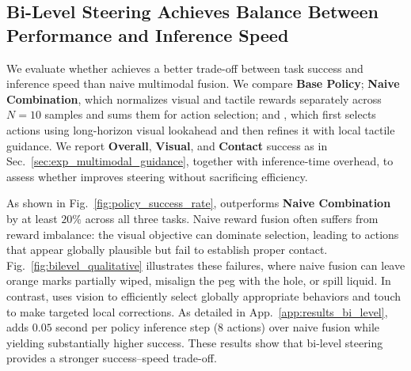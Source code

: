 \subsection{Bi-Level Steering Achieves Balance Between Performance and Inference Speed}
\label{sec:experiment_bilevel}

We evaluate whether \ours achieves a better trade-off between task success and inference speed than naive multimodal fusion. We compare \textbf{Base Policy}; \textbf{Naive Combination}, which normalizes visual and tactile rewards separately across $N=10$ samples and sums them for action selection; and \ours, which first selects actions using long-horizon visual lookahead and then refines it with local tactile guidance. We report \textbf{Overall}, \textbf{Visual}, and \textbf{Contact} success as in Sec.~\ref{sec:exp_multimodal_guidance}, together with inference-time overhead, to assess whether \ours improves steering without sacrificing efficiency.

As shown in Fig.~\ref{fig:policy_success_rate}, \ours outperforms \textbf{Naive Combination} by at least $20\%$ across all three tasks. Naive reward fusion often suffers from reward imbalance: the visual objective can dominate selection, leading to actions that appear globally plausible but fail to establish proper contact. Fig.~\ref{fig:bilevel_qualitative} illustrates these failures, where naive fusion can leave orange marks partially wiped, misalign the peg with the hole, or spill liquid. In contrast, \ours uses vision to efficiently select globally appropriate behaviors and touch to make targeted local corrections. As detailed in App.~\ref{app:results_bi_level}, \ours adds $0.05$ second per policy inference step (8 actions) over naive fusion while yielding substantially higher success. These results show that bi-level steering provides a stronger success--speed trade-off.









































